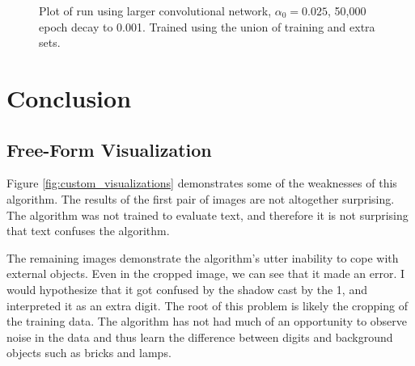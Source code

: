 \documentclass[12pt]{article}
\begin{document}
\begin{figure}
\centering
{}\hfill
{}\hfill
\caption{Plot of run using larger convolutional network, $\alpha_0 = 0.025$, 50,000 epoch decay to 0.001. Trained using the union of training and extra sets.}
\label{fig:final_moredata}
\end{figure}

\section{Conclusion}
\subsection{Free-Form Visualization} \label{sssec:ffv}
Figure \ref{fig:custom_visualizations} demonstrates some of the weaknesses of this algorithm.
The results of the first pair of images are not altogether surprising.
The algorithm was not trained to evaluate text, and therefore it is not surprising that text confuses the algorithm.

The remaining images demonstrate the algorithm's utter inability to cope with external objects. 
Even in the cropped image, we can see that it made an error. 
I would hypothesize that it got confused by the shadow cast by the 1, and interpreted it as an extra digit.
The root of this problem is likely the cropping of the training data.
The algorithm has not had much of an opportunity to observe noise in the data and thus learn the difference between digits and background objects such as bricks and lamps.
\end{document}
